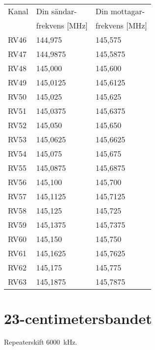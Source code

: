 \begin{tabular}{ l | l | l }
  Kanal & Din sändar- & Din mottagar- \\
        & frekvens [MHz] & frekvens [MHz] \\
  \hline
  RV46 & 144,975 & 145,575\\
  RV47 & 144,9875 & 145,5875\\
  RV48 & 145,000 & 145,600 \\
  RV49 & 145,0125 & 145,6125 \\
  RV50 & 145,025 & 145,625 \\
  RV51 & 145,0375 & 145,6375 \\
  RV52 & 145,050 & 145,650 \\
  RV53 & 145,0625 & 145,6625 \\
  RV54 & 145,075 & 145,675 \\
  RV55 & 145,0875 & 145,6875 \\
  RV56 & 145,100 & 145,700 \\
  RV57 & 145,1125 & 145,7125 \\
  RV58 & 145,125 & 145,725 \\
  RV59 & 145,1375 & 145,7375 \\
  RV60 & 145,150 & 145,750 \\
  RV61 & 145,1625 & 145,7625 \\
  RV62 & 145,175 & 145,775 \\
  RV63 & 145,1875 & 145,7875 \\
\end{tabular}

\section{23-centimetersbandet}
Repeaterskift 6000~kHz.

